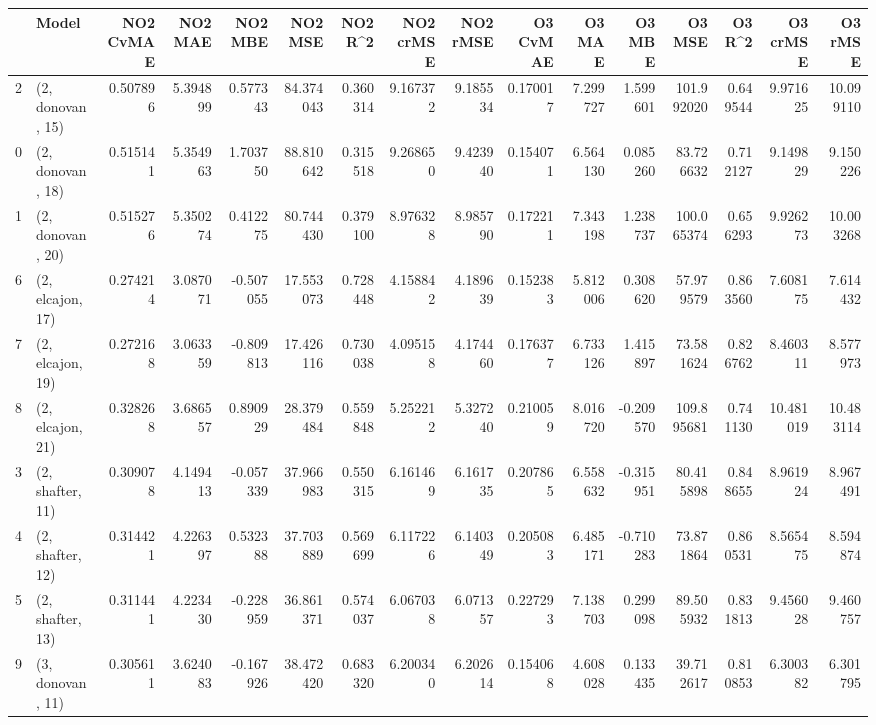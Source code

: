 \begin{tabular}{llrrrrrrrrrrrrrr}
\toprule
{} &             Model &  NO2 CvMAE &   NO2 MAE &   NO2 MBE &    NO2 MSE &   NO2 R\textasciicircum2 &  NO2 crMSE &  NO2 rMSE &  O3 CvMAE &     O3 MAE &    O3 MBE &      O3 MSE &    O3 R\textasciicircum2 &   O3 crMSE &    O3 rMSE \\
\midrule
2  &  (2, donovan, 15) &   0.507896 &  5.394899 &  0.577343 &  84.374043 &  0.360314 &   9.167372 &  9.185534 &  0.170017 &   7.299727 &  1.599601 &  101.992020 &  0.649544 &   9.971625 &  10.099110 \\
0  &  (2, donovan, 18) &   0.515141 &  5.354963 &  1.703750 &  88.810642 &  0.315518 &   9.268650 &  9.423940 &  0.154071 &   6.564130 &  0.085260 &   83.726632 &  0.712127 &   9.149829 &   9.150226 \\
1  &  (2, donovan, 20) &   0.515276 &  5.350274 &  0.412275 &  80.744430 &  0.379100 &   8.976328 &  8.985790 &  0.172211 &   7.343198 &  1.238737 &  100.065374 &  0.656293 &   9.926273 &  10.003268 \\
6  &  (2, elcajon, 17) &   0.274214 &  3.087071 & -0.507055 &  17.553073 &  0.728448 &   4.158842 &  4.189639 &  0.152383 &   5.812006 &  0.308620 &   57.979579 &  0.863560 &   7.608175 &   7.614432 \\
7  &  (2, elcajon, 19) &   0.272168 &  3.063359 & -0.809813 &  17.426116 &  0.730038 &   4.095158 &  4.174460 &  0.176377 &   6.733126 &  1.415897 &   73.581624 &  0.826762 &   8.460311 &   8.577973 \\
8  &  (2, elcajon, 21) &   0.328268 &  3.686557 &  0.890929 &  28.379484 &  0.559848 &   5.252212 &  5.327240 &  0.210059 &   8.016720 & -0.209570 &  109.895681 &  0.741130 &  10.481019 &  10.483114 \\
3  &  (2, shafter, 11) &   0.309078 &  4.149413 & -0.057339 &  37.966983 &  0.550315 &   6.161469 &  6.161735 &  0.207865 &   6.558632 & -0.315951 &   80.415898 &  0.848655 &   8.961924 &   8.967491 \\
4  &  (2, shafter, 12) &   0.314421 &  4.226397 &  0.532388 &  37.703889 &  0.569699 &   6.117226 &  6.140349 &  0.205083 &   6.485171 & -0.710283 &   73.871864 &  0.860531 &   8.565475 &   8.594874 \\
5  &  (2, shafter, 13) &   0.311441 &  4.223430 & -0.228959 &  36.861371 &  0.574037 &   6.067038 &  6.071357 &  0.227293 &   7.138703 &  0.299098 &   89.505932 &  0.831813 &   9.456028 &   9.460757 \\
9  &  (3, donovan, 11) &   0.305611 &  3.624083 & -0.167926 &  38.472420 &  0.683320 &   6.200340 &  6.202614 &  0.154068 &   4.608028 &  0.133435 &   39.712617 &  0.810853 &   6.300382 &   6.301795 \\

\end{tabular}
